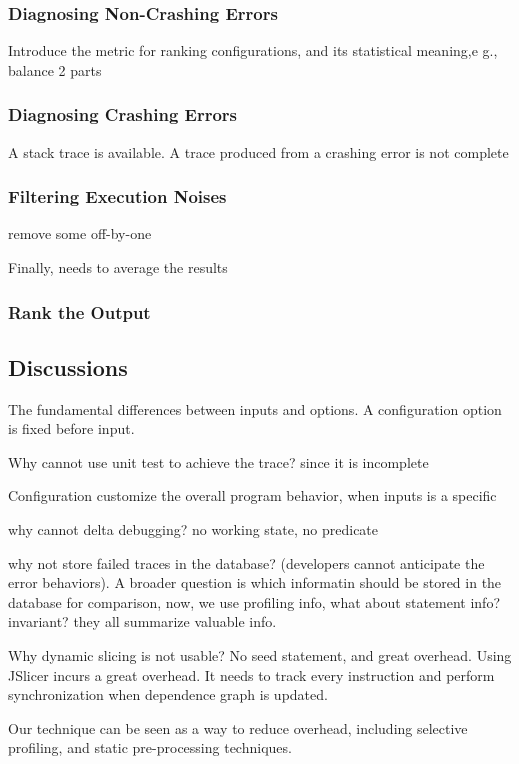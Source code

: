 \subsubsection{Diagnosing Non-Crashing Errors}

Introduce the metric for ranking configurations, and its
statistical meaning,e g., balance 2 parts

\subsubsection{Diagnosing Crashing Errors}

A stack trace is available. A trace produced from a crashing error is not complete

\subsubsection{Filtering Execution Noises}

remove some off-by-one


Finally, needs to average the results
\subsubsection{Rank the Output}

\subsection{Discussions}

The fundamental differences between inputs and options. A configuration
option is fixed before input.

Why cannot use unit test to achieve the trace? since it is incomplete

Configuration customize the overall program behavior, when inputs is a specific

why cannot delta debugging? no working state, no predicate

why not store failed traces in the database? (developers
cannot anticipate the error behaviors). A broader question is which
informatin should be stored in the database for comparison, now, we use
profiling info, what about statement info? invariant? they all
summarize valuable info.

Why dynamic slicing is not usable? No seed statement, and great overhead. Using JSlicer incurs
a great overhead. It needs to track every instruction and
perform synchronization when dependence graph is updated.

Our technique can be seen as a way to reduce overhead,
including selective profiling, and static pre-processing
techniques.

